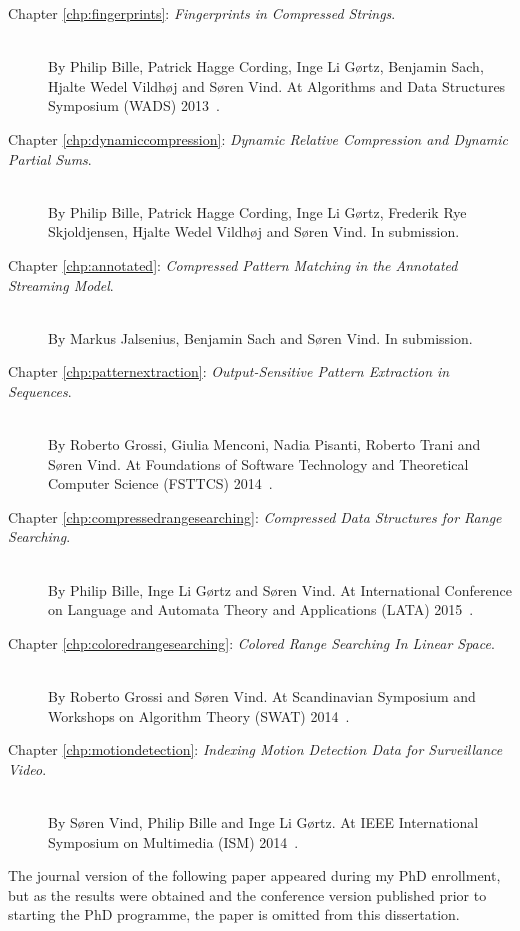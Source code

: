 \begin{description}
    \item[Chapter \ref{chp:fingerprints}: \emph{Fingerprints in Compressed Strings}.]~\\
    By Philip Bille, Patrick Hagge Cording, Inge Li Gørtz, Benjamin Sach, Hjalte Wedel Vildhøj and Søren Vind. At Algorithms and Data Structures Symposium (WADS) 2013~\cite{bille2013fingerprints}.
    \item[Chapter \ref{chp:dynamiccompression}: \emph{Dynamic Relative Compression and Dynamic Partial Sums}.]~\\
    By Philip Bille, Patrick Hagge Cording, Inge Li Gørtz, Frederik Rye Skjoldjensen, Hjalte Wedel Vildhøj and Søren Vind. In submission.
    \item[Chapter \ref{chp:annotated}: \emph{Compressed Pattern Matching in the Annotated Streaming Model}.]~\\
    By Markus Jalsenius, Benjamin Sach and Søren Vind. In submission.
    \item[Chapter \ref{chp:patternextraction}: \emph{Output-Sensitive Pattern Extraction in Sequences}.]~\\
    By Roberto Grossi, Giulia Menconi, Nadia Pisanti, Roberto Trani and Søren Vind. At Foundations of Software Technology and Theoretical Computer Science (FSTTCS) 2014~\cite{grossi2014output}.
    \item[Chapter \ref{chp:compressedrangesearching}: \emph{Compressed Data Structures for Range Searching}.]~\\
    By Philip Bille, Inge Li Gørtz and Søren Vind. At International Conference on Language and Automata Theory and Applications (LATA) 2015~\cite{bille2015compressedrs}.
    \item[Chapter \ref{chp:coloredrangesearching}: \emph{Colored Range Searching In Linear Space}.]~\\
    By Roberto Grossi and Søren Vind. At Scandinavian Symposium and Workshops on Algorithm Theory (SWAT) 2014~\cite{grossi2014colored}.
    \item[Chapter \ref{chp:motiondetection}: \emph{Indexing Motion Detection Data for Surveillance Video}.]~\\
    By Søren Vind, Philip Bille and Inge Li Gørtz. At IEEE International Symposium on Multimedia (ISM) 2014~\cite{vind2014indexing}.
\end{description}

The journal version of the following paper appeared during my PhD enrollment, but as the results were obtained and the conference version published prior to starting the PhD programme, the paper is omitted from this dissertation.

